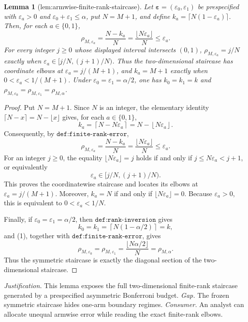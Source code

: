 \documentclass{article}
\newtheorem{lemma}{Lemma}
\begin{document}
\begin{lemma}[lem:armwise-finite-rank-staircase]\label{lem:armwise-finite-rank-staircase}
Let \(\boldsymbol\varepsilon=(\varepsilon_0,\varepsilon_1)\) be prespecified with \(\varepsilon_a>0\) and \(\varepsilon_0+\varepsilon_1\le\alpha\), put \(N=M+1\), and define \(k_a=\lceil N(1-\varepsilon_a)\rceil\). Then, for each \(a\in\{0,1\}\),
\[
\rho_{M,\varepsilon_a}=\frac{N-k_a}{N}=\frac{\lfloor N\varepsilon_a\rfloor}{N}\le\varepsilon_a.
\]
For every integer \(j\ge0\) whose displayed interval intersects \((0,1)\), \(\rho_{M,\varepsilon_a}=j/N\) exactly when \(\varepsilon_a\in[j/N,(j+1)/N)\). Thus the two-dimensional staircase has coordinate elbows at \(\varepsilon_a=j/(M+1)\), and \(k_a=M+1\) exactly when \(0<\varepsilon_a<1/(M+1)\). Under \(\varepsilon_0=\varepsilon_1=\alpha/2\), one has \(k_0=k_1=k\) and \(\rho_{M,\varepsilon_0}=\rho_{M,\varepsilon_1}=\rho_{M,\alpha}\).
\end{lemma}
\begin{proof}
Put \(N=M+1\). Since \(N\) is an integer, the elementary identity \(\lceil N-x\rceil=N-\lfloor x\rfloor\) gives, for each \(a\in\{0,1\}\),
\[
k_a=\left\lceil N-N\varepsilon_a\right\rceil=N-\left\lfloor N\varepsilon_a\right\rfloor.
\]
Consequently, by \(\texttt{def:finite-rank-error}\),
\[
\rho_{M,\varepsilon_a}=\frac{N-k_a}{N}=\frac{\lfloor N\varepsilon_a\rfloor}{N}\le \varepsilon_a.
\tag{1}
\]
For an integer \(j\ge0\), the equality \(\lfloor N\varepsilon_a\rfloor=j\) holds if and only if \(j\le N\varepsilon_a<j+1\), or equivalently
\[
\varepsilon_a\in[j/N,(j+1)/N).
\tag{2}
\]
This proves the coordinatewise staircase and locates its elbows at \(\varepsilon_a=j/(M+1)\). Moreover, \(k_a=N\) if and only if \(\lfloor N\varepsilon_a\rfloor=0\). Because \(\varepsilon_a>0\), this is equivalent to \(0<\varepsilon_a<1/N\).

Finally, if \(\varepsilon_0=\varepsilon_1=\alpha/2\), then \(\texttt{def:rank-inversion}\) gives
\[
k_0=k_1=\left\lceil N(1-\alpha/2)\right\rceil=k,
\]
and (1), together with \(\texttt{def:finite-rank-error}\), gives
\[
\rho_{M,\varepsilon_0}=\rho_{M,\varepsilon_1}=\frac{\lfloor N\alpha/2\rfloor}{N}=\rho_{M,\alpha}.
\]
Thus the symmetric staircase is exactly the diagonal section of the two-dimensional staircase.
\end{proof}
\par\smallskip\noindent \textit{Justification.} This lemma exposes the full two-dimensional finite-rank staircase generated by a prespecified asymmetric Bonferroni budget. \textit{Gap.} The frozen symmetric staircase hides one-arm boundary regimes. \textit{Consumer.} An analyst can allocate unequal armwise error while reading the exact finite-rank elbows.
\end{document}
